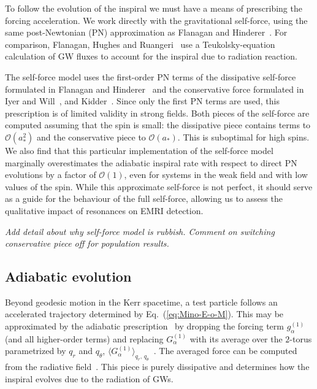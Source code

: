 \documentclass[aps,prd,amsfonts,amssymb,amsmath,nofootinbib,showpacs,superscriptaddress,twocolumn,floatfix]{revtex4-1}
\newcommand{\eqnref}[1]{Eq.~(\ref{eq:#1})}
\newcommand{\order}[1]{\ensuremath{\mathcal{O}({#1})}}
\begin{document}
To follow the evolution of the inspiral we must have a means of prescribing the forcing acceleration. We work directly with the gravitational self-force, using the same post-Newtonian (PN) approximation as Flanagan and Hinderer~\cite{Flanagan2012}. For comparison, Flanagan, Hughes and Ruangeri~\cite{Flanagan2012a} use a Teukolsky-equation calculation of GW fluxes to account for the inspiral due to radiation reaction.

The self-force model uses the first-order PN terms of the dissipative self-force formulated in Flanagan and Hinderer~\cite{Flanagan2007} and the conservative force formulated in Iyer and Will~\cite{Iyer1993}, and Kidder~\cite{Kidder1995}. Since only the first PN terms are used, this prescription is of limited validity in strong fields. Both pieces of the self-force are computed assuming that the spin is small: the dissipative piece contains terms to $\order{a_\ast^2}$ and the conservative piece to $\order{a_\ast}$. This is suboptimal for high spins. We also find that this particular implementation of the self-force model marginally overestimates the adiabatic inspiral rate with respect to direct PN evolutions by a factor of $\mathcal{O}(1)$, even for systems in the weak field and with low values of the spin. While this approximate self-force is not perfect, it should serve as a guide for the behaviour of the full self-force, allowing us to assess the qualitative impact of resonances on EMRI detection.

\emph{Add detail about why self-force model is rubbish. Comment on switching conservative piece off for population results.}

\subsection{Adiabatic evolution}
\label{sec:adiabatic}

Beyond geodesic motion in the Kerr spacetime, a test particle follows an accelerated trajectory determined by \eqnref{Mino-E-o-M}. This may be approximated by the adiabatic prescription~\cite{Hinderer2008} by dropping the forcing term $g_\alpha^{(1)}$ (and all higher-order terms) and replacing $G_\alpha^{(1)}$ with its average over the $2$-torus parametrized by $q_r$ and $q_\theta$, $\langle G_\alpha^{(1)}\rangle_{q_r,\,q_\theta}$~\cite{Drasco2005,Grossman2011}. The averaged force can be computed from the radiative field~\cite{Galtsov1982,Mino2003,Sago2006,Ganz2007}. This piece is purely dissipative and determines how the inspiral evolves due to the radiation of GWs.
\end{document}

